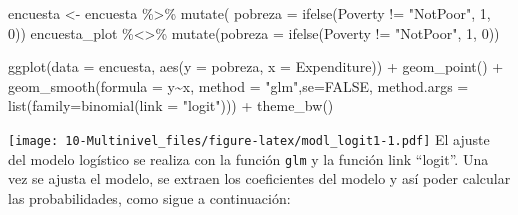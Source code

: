 \documentclass[
  12pt,
]{book}
\newenvironment{Shaded}{\begin{snugshade}}{\end{snugshade}}
\newcommand{\AttributeTok}[1]{\textcolor[rgb]{0.77,0.63,0.00}{#1}}
\newcommand{\ConstantTok}[1]{\textcolor[rgb]{0.00,0.00,0.00}{#1}}
\newcommand{\DecValTok}[1]{\textcolor[rgb]{0.00,0.00,0.81}{#1}}
\newcommand{\FunctionTok}[1]{\textcolor[rgb]{0.00,0.00,0.00}{#1}}
\newcommand{\NormalTok}[1]{#1}
\newcommand{\OtherTok}[1]{\textcolor[rgb]{0.56,0.35,0.01}{#1}}
\newcommand{\SpecialCharTok}[1]{\textcolor[rgb]{0.00,0.00,0.00}{#1}}
\newcommand{\StringTok}[1]{\textcolor[rgb]{0.31,0.60,0.02}{#1}}
\begin{document}
\begin{Shaded}
\begin{Highlighting}[]
\NormalTok{encuesta }\OtherTok{\textless{}{-}}\NormalTok{ encuesta }\SpecialCharTok{\%\textgreater{}\%} \FunctionTok{mutate}\NormalTok{( }\AttributeTok{pobreza =} \FunctionTok{ifelse}\NormalTok{(Poverty }\SpecialCharTok{!=} \StringTok{"NotPoor"}\NormalTok{, }\DecValTok{1}\NormalTok{, }\DecValTok{0}\NormalTok{))}
\NormalTok{encuesta\_plot }\SpecialCharTok{\%\textless{}\textgreater{}\%} \FunctionTok{mutate}\NormalTok{(}\AttributeTok{pobreza =} \FunctionTok{ifelse}\NormalTok{(Poverty }\SpecialCharTok{!=} \StringTok{"NotPoor"}\NormalTok{, }\DecValTok{1}\NormalTok{, }\DecValTok{0}\NormalTok{))}

\FunctionTok{ggplot}\NormalTok{(}\AttributeTok{data =}\NormalTok{ encuesta, }\FunctionTok{aes}\NormalTok{(}\AttributeTok{y =}\NormalTok{ pobreza, }\AttributeTok{x =}\NormalTok{ Expenditure)) }\SpecialCharTok{+} 
  \FunctionTok{geom\_point}\NormalTok{() }\SpecialCharTok{+} \FunctionTok{geom\_smooth}\NormalTok{(}\AttributeTok{formula =}\NormalTok{ y}\SpecialCharTok{\textasciitilde{}}\NormalTok{x, }\AttributeTok{method =} \StringTok{"glm"}\NormalTok{,}\AttributeTok{se=}\ConstantTok{FALSE}\NormalTok{, }
    \AttributeTok{method.args =} \FunctionTok{list}\NormalTok{(}\AttributeTok{family=}\FunctionTok{binomial}\NormalTok{(}\AttributeTok{link =} \StringTok{"logit"}\NormalTok{))) }\SpecialCharTok{+} \FunctionTok{theme\_bw}\NormalTok{()}
\end{Highlighting}
\end{Shaded}

\texttt{[image: 10-Multinivel\_files/figure-latex/modl\_logit1-1.pdf]}
El ajuste del modelo logístico se realiza con la función \texttt{glm} y la función link ``logit''. Una vez se ajusta el modelo, se extraen los coeficientes del modelo y así poder calcular las probabilidades, como sigue a continuación:
\end{document}

